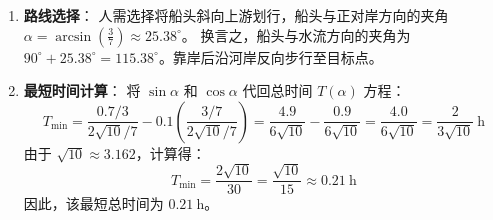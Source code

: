 \begin{solution}
\begin{enumerate}
    \item[(a)] \textbf{路线选择}：
    人需选择将船头斜向上游划行，船头与正对岸方向的夹角 $\alpha = \arcsin\left(\frac{3}{7}\right) \approx 25.38^\circ$。
    换言之，船头与水流方向的夹角为 $90^\circ + 25.38^\circ = 115.38^\circ$。靠岸后沿河岸反向步行至目标点。

    \item[(b)] \textbf{最短时间计算}：
    将 $\sin\alpha$ 和 $\cos\alpha$ 代回总时间 $T(\alpha)$ 方程：
    $$ T_{\mathrm{min}} = \frac{0.7/3}{2\sqrt{10}/7} - 0.1 \left( \frac{3/7}{2\sqrt{10}/7} \right) = \frac{4.9}{6\sqrt{10}} - \frac{0.9}{6\sqrt{10}} = \frac{4.0}{6\sqrt{10}} = \frac{2}{3\sqrt{10}} \ \mathrm{h} $$
    由于 $\sqrt{10} \approx 3.162$，计算得：
    $$ T_{\mathrm{min}} = \frac{2 \sqrt{10}}{30} = \frac{\sqrt{10}}{15} \approx 0.21 \ \mathrm{h} $$
    因此，该最短总时间为 $0.21 \ \mathrm{h}$。
\end{enumerate}
\end{solution}

